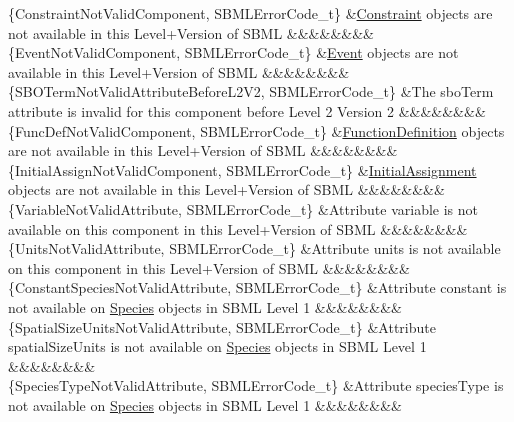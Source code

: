 \begin{DoxyParagraph}{}
\begin{longtabu}
\{Constraint\+Not\+Valid\+Component, S\+B\+M\+L\+Error\+Code\+\_\+t\} &\hyperlink{class_constraint}{Constraint} objects are not available in this Level+\+Version of S\+B\+ML &&&&&&&&\\
\{Event\+Not\+Valid\+Component, S\+B\+M\+L\+Error\+Code\+\_\+t\} &\hyperlink{class_event}{Event} objects are not available in this Level+\+Version of S\+B\+ML &&&&&&&&\\
\{S\+B\+O\+Term\+Not\+Valid\+Attribute\+Before\+L2\+V2, S\+B\+M\+L\+Error\+Code\+\_\+t\} &The \textquotesingle{}sbo\+Term\textquotesingle{} attribute is invalid for this component before Level 2 Version 2 &&&&&&&&\\
\{Func\+Def\+Not\+Valid\+Component, S\+B\+M\+L\+Error\+Code\+\_\+t\} &\hyperlink{class_function_definition}{Function\+Definition} objects are not available in this Level+\+Version of S\+B\+ML &&&&&&&&\\
\{Initial\+Assign\+Not\+Valid\+Component, S\+B\+M\+L\+Error\+Code\+\_\+t\} &\hyperlink{class_initial_assignment}{Initial\+Assignment} objects are not available in this Level+\+Version of S\+B\+ML &&&&&&&&\\
\{Variable\+Not\+Valid\+Attribute, S\+B\+M\+L\+Error\+Code\+\_\+t\} &Attribute \textquotesingle{}variable\textquotesingle{} is not available on this component in this Level+\+Version of S\+B\+ML &&&&&&&&\\
\{Units\+Not\+Valid\+Attribute, S\+B\+M\+L\+Error\+Code\+\_\+t\} &Attribute \textquotesingle{}units\textquotesingle{} is not available on this component in this Level+\+Version of S\+B\+ML &&&&&&&&\\
\{Constant\+Species\+Not\+Valid\+Attribute, S\+B\+M\+L\+Error\+Code\+\_\+t\} &Attribute \textquotesingle{}constant\textquotesingle{} is not available on \hyperlink{class_species}{Species} objects in S\+B\+ML Level 1 &&&&&&&&\\
\{Spatial\+Size\+Units\+Not\+Valid\+Attribute, S\+B\+M\+L\+Error\+Code\+\_\+t\} &Attribute \textquotesingle{}spatial\+Size\+Units\textquotesingle{} is not available on \hyperlink{class_species}{Species} objects in S\+B\+ML Level 1 &&&&&&&&\\
\{Species\+Type\+Not\+Valid\+Attribute, S\+B\+M\+L\+Error\+Code\+\_\+t\} &Attribute \textquotesingle{}species\+Type\textquotesingle{} is not available on \hyperlink{class_species}{Species} objects in S\+B\+ML Level 1 &&&&&&&&\\

\end{longtabu}
\end{DoxyParagraph}
